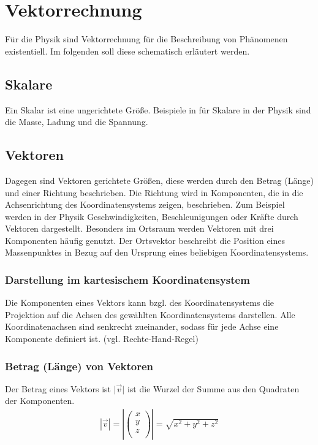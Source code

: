 \chapter{Vektorrechnung}
Für die Physik sind Vektorrechnung für die Beschreibung von Phänomenen existentiell. Im folgenden soll diese schematisch erläutert werden.
\section{Skalare}
Ein Skalar ist eine ungerichtete Größe. Beispiele in für Skalare in der Physik sind die Masse, Ladung und die Spannung.
\section{Vektoren}
Dagegen sind Vektoren gerichtete Größen, diese werden durch den Betrag (Länge) und einer Richtung beschrieben.  Die Richtung wird in Komponenten, die in die Achsenrichtung des Koordinatensystems zeigen, beschrieben. Zum Beispiel werden in der Physik Geschwindigkeiten, Beschleunigungen oder Kräfte durch Vektoren dargestellt. Besonders im Ortsraum werden Vektoren mit drei Komponenten häufig genutzt.
Der Ortsvektor beschreibt die Position  eines Massenpunktes in Bezug auf den Ursprung eines beliebigen Koordinatensystems.
\subsection{Darstellung im kartesischem Koordinatensystem}
Die Komponenten eines Vektors kann bzgl. des Koordinatensystems die Projektion auf die Achsen des gewählten Koordinatensystems darstellen. Alle Koordinatenachsen sind senkrecht zueinander, sodass für jede Achse eine Komponente definiert ist. (vgl. Rechte-Hand-Regel)
\subsection{Betrag (Länge) von Vektoren}  
Der Betrag eines Vektors ist $\vert\vec v\vert$ ist die Wurzel der Summe aus den Quadraten der Komponenten.
\begin{align*}
	\left| \vec v \right| = \left| \left(
	\begin{array}{c}
	x \\ y \\ z \\
	\end{array}
	\right) \right| = \sqrt{x^2 + y^2 + z^2}
\end{align*}

